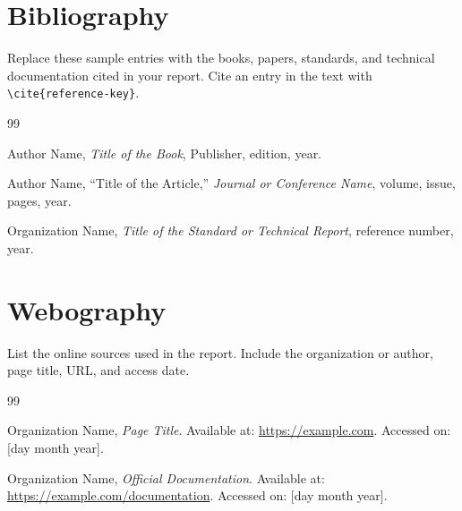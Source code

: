 \chapter*{Bibliography}

Replace these sample entries with the books, papers, standards, and technical documentation cited in your report. Cite an entry in the text with \texttt{\textbackslash cite\{reference-key\}}.

\begin{thebibliography}{99}

Author Name, \textit{Title of the Book}, Publisher, edition, year.

Author Name, ``Title of the Article,'' \textit{Journal or Conference Name}, volume, issue, pages, year.

Organization Name, \textit{Title of the Standard or Technical Report}, reference number, year.

\end{thebibliography}

\chapter*{Webography}

List the online sources used in the report. Include the organization or author, page title, URL, and access date.

\begin{thebibliography}{99}

Organization Name, \textit{Page Title}. Available at: \url{https://example.com}. Accessed on: [day month year].

Organization Name, \textit{Official Documentation}. Available at: \url{https://example.com/documentation}. Accessed on: [day month year].

\end{thebibliography}
